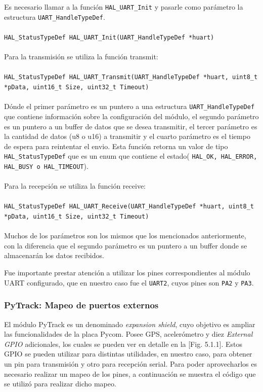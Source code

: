 \documentclass[12pt]{article}
\begin{document}
Es necesario llamar a la función \texttt{HAL\_UART\_Init} y pasarle como parámetro la estructura \texttt{UART\_HandleTypeDef}.
\\\\
\lstinline|HAL_StatusTypeDef HAL_UART_Init(UART_HandleTypeDef *huart)|
\\\\
Para la transmisión se utiliza la función transmit:
\\\\
\lstinline|HAL_StatusTypeDef HAL_UART_Transmit(UART_HandleTypeDef *huart, uint8_t *pData, uint16_t Size, uint32_t Timeout)|
\\\\
Dónde el primer parámetro es un puntero a una estructura \texttt{UART\_HandleTypeDef} que contiene información sobre la configuración del módulo, el segundo parámetro es un puntero a un buffer de datos que se desea transmitir, el tercer parámetro es la cantidad de datos (u8 o u16) a transmitir y el cuarto parámetro es el tiempo de espera para reintentar el envio. Esta función retorna un valor de tipo \texttt{HAL\_StatusTypeDef} que es un enum que contiene el estado( \texttt{HAL\_OK, HAL\_ERROR, HAL\_BUSY o HAL\_TIMEOUT}).
\\\\
Para la recepción se utiliza la función receive:
\\\\
\lstinline|HAL_StatusTypeDef HAL_UART_Receive(UART_HandleTypeDef *huart, uint8_t *pData, uint16_t Size, uint32_t Timeout)|
\\\\
Muchos de los parámetros son los mismos que los mencionados anteriormente, con la diferencia que el segundo parámetro es un puntero a un buffer donde se almacenarán los datos recibidos.

Fue importante prestar atención a utilizar los pines correspondientes al módulo UART configurado, que en nuestro caso fue el \texttt{UART2}, cuyos pines son \texttt{PA2} y \texttt{PA3}.

\subsubsection{PyTrack: Mapeo de puertos externos}
El módulo PyTrack es un denominado \textit{expansion shield}, cuyo objetivo es ampliar las funcionalidades de la placa Pycom. Posee GPS, acelerómetro y diez \textit{External GPIO} adicionales, los cuales se pueden ver en detalle en la [Fig. 5.1.1]. Estos GPIO se pueden utilizar para distintas utilidades, en nuestro caso, para obtener un pin para transmisión y otro para recepción serial. Para poder aprovecharlos es necesario realizar un mapeo de los pines, a continuación se muestra el código que se utilizó para realizar dicho mapeo.
\end{document}
